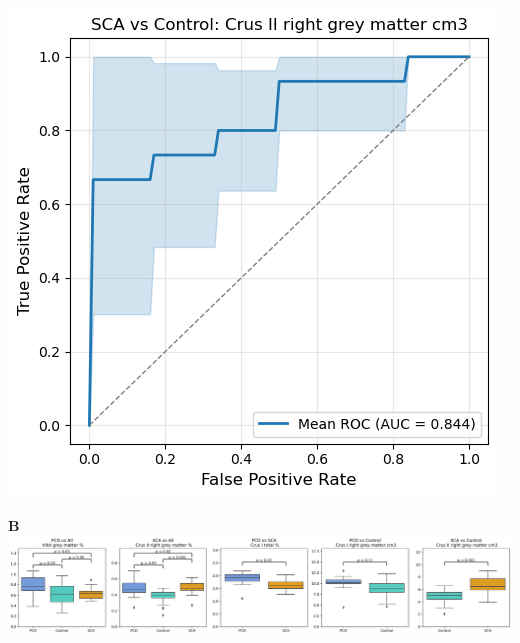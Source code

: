 \documentclass{standalone}
\begin{document}
\begin{minipage}[t]{0.19\textwidth}
    \textbf{}\\[4pt]
    \includegraphics[width=\textwidth]{graphics/ROC_SCA_vs_Control.png}
\end{minipage}
\begin{minipage}[t]{0.95\textwidth}
    \textbf{B}\\[4pt]
    \includegraphics[width=\textwidth]{graphics/feature_distributions.png}
\end{minipage}
\end{document}

